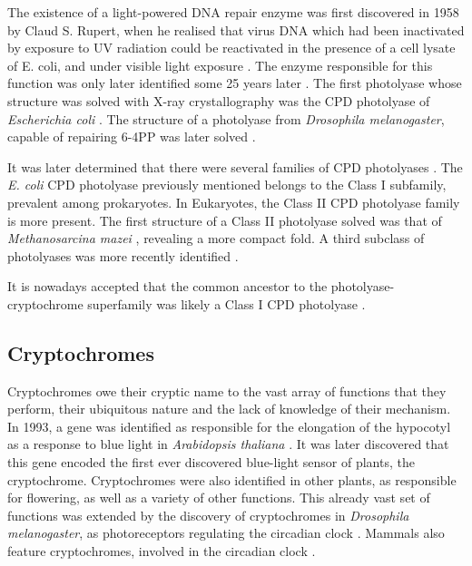 The existence of a light-powered DNA repair enzyme was first discovered in 1958 by Claud S. Rupert, when he realised that virus DNA which had been inactivated by exposure to UV radiation could be reactivated in the presence of a cell lysate of E. coli, and under visible light exposure \parencite{rupertPHOTOREACTIVATIONVITROULTRAVIOLET1958}. The enzyme responsible for this function was only later identified some 25 years later \parencite{sancarDNAPhotolyasesPhysical1990}. The first photolyase whose structure was solved with X-ray crystallography was the CPD photolyase of \textit{Escherichia coli} \parencite{parkCrystalStructureDNA1995}. The structure of a photolyase from \textit{Drosophila melanogaster}, capable of repairing 6-4PP was later solved \parencite{maulCrystalStructureMechanism2008}.

It was later determined that there were several families of CPD photolyases \parencite{meiEvolutionaryHistoryPhotolyase2015}. The \textit{E. coli} CPD photolyase previously mentioned belongs to the Class I subfamily, prevalent among prokaryotes. In Eukaryotes, the Class II CPD photolyase family is more present. The first structure of a Class II photolyase solved was that of \textit{Methanosarcina mazei} \parencite{kiontkeCrystalStructuresArchaeal2011}, revealing a more compact fold. A third subclass of photolyases was more recently identified \parencite{ozturkPurificationCharacterizationType2008}.

It is nowadays accepted that the common ancestor to the photolyase-cryptochrome superfamily was likely a Class I CPD photolyase \parencite{mullerStructuralBiologyDNA2009}. 

\subsection{Cryptochromes}\label{sec:cryptochrome_families}
Cryptochromes owe their cryptic name to the vast array of functions that they perform, their ubiquitous nature and the lack of knowledge of their mechanism. In 1993, a gene was identified as responsible for the elongation of the hypocotyl as a response to blue light in \textit{Arabidopsis thaliana} \parencite{ahmadHY4GeneThaliana1993}. It was later discovered that this gene encoded the first ever discovered blue-light sensor of plants, the cryptochrome. Cryptochromes were also identified in other plants, as responsible for flowering, as well as a variety of other functions\parencite{kavakliPhotolyaseCryptochromeFamily2017}. This already vast set of functions was extended by the discovery of cryptochromes in \textit{Drosophila melanogaster}, as photoreceptors regulating the circadian clock \parencite{emeryCRYDrosophilaClock1998,stanewskyCrybMutationIdentifies1998}. Mammals also feature cryptochromes, involved in the circadian clock \parencite{vitaternaDifferentialRegulationMammalian1999}. 

